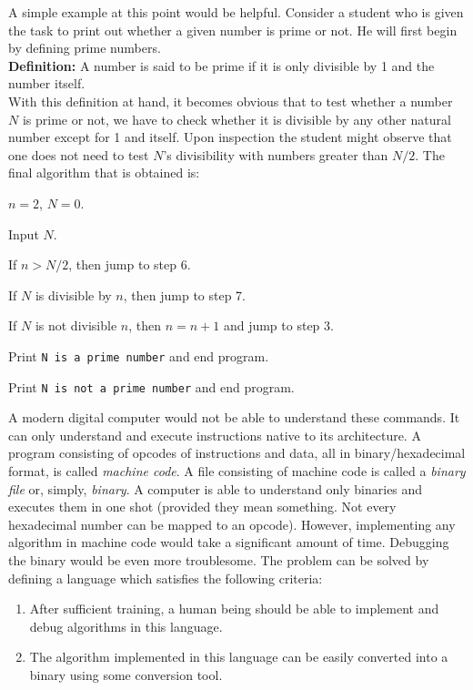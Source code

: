 A simple example at this point would be helpful. Consider a student who is given the task to print out whether a given number is prime or not. He will first begin by defining prime numbers.\\
\textbf{Definition:} A number is said to be prime if it is only divisible by 1 and the number itself.\\
With this definition at hand, it becomes obvious that to test whether a number $N$ is prime or not, we have to check whether it is divisible by any other natural number except for 1 and itself. Upon inspection the student might observe that one does not need to test $N$'s divisibility with numbers greater than $N / 2$. The final algorithm that is obtained is:
\begin{steps}[leftmargin=2cm]
\item $n = 2$, $N = 0$.
\item Input $N$.
\item If $n > N/2$, then jump to step 6. 
\item If $N$ is divisible by $n$, then jump to step 7.
\item If $N$ is not divisible $n$, then $n = n + 1$ and jump to step 3.
\item Print \verb|N is a prime number| and end program.
\item Print \verb|N is not a prime number| and end program.
\end{steps}
A modern digital computer would not be able to understand these commands. It can only understand and execute instructions native to its architecture. A program consisting of opcodes of instructions and data, all in binary/hexadecimal format, is called \textit{machine code}. A file consisting of machine code is called a \textit{binary file} or, simply, \textit{binary}. A computer is able to understand only binaries and executes them in one shot (provided they mean something. Not every hexadecimal number can be mapped to an opcode). However, implementing any algorithm in machine code would take a significant amount of time. Debugging the binary would be even more troublesome. 
The problem can be solved by defining a language which satisfies the following criteria:
\begin{enumerate}
\item After sufficient training, a human being should be able to implement and debug algorithms in this language.
\item The algorithm implemented in this language can be easily converted into a binary using some conversion tool.
\end{enumerate}

